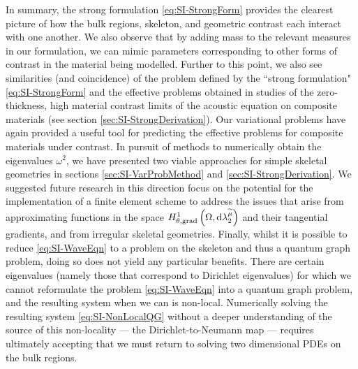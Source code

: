 In summary, the strong formulation \eqref{eq:SI-StrongForm} provides the clearest picture of how the bulk regions, skeleton, and geometric contrast each interact with one another.
We also observe that by adding mass to the relevant measures in our formulation, we can mimic parameters corresponding to other forms of contrast in the material being modelled.
Further to this point, we also see similarities (and coincidence) of the problem defined by the ``strong formulation" \eqref{eq:SI-StrongForm} and the effective problems obtained in studies of the zero-thickness, high material contrast limits of the acoustic equation on composite materials (see section \ref{sec:SI-StrongDerivation}).
Our variational problems have again provided a useful tool for predicting the effective problems for composite materials under contrast.
In pursuit of methods to numerically obtain the eigenvalues $\omega^2$, we have presented two viable approaches for simple skeletal geometries in sections \ref{sec:SI-VarProbMethod} and \ref{sec:SI-StrongDerivation}.
We suggested future research in this direction focus on the potential for the implementation of a finite element scheme to address the issues that arise from approximating functions in the space $H^1_{\theta, \mathrm{grad}}\left( \Omega, \mathrm{d}\lambda_2^{\widetilde{\mu}} \right)$ and their tangential gradients, and from irregular skeletal geometries.
Finally, whilst it is possible to reduce \eqref{eq:SI-WaveEqn} to a problem on the skeleton and thus a quantum graph problem, doing so does not yield any particular benefits.
There are certain eigenvalues (namely those that correspond to Dirichlet eigenvalues) for which we cannot reformulate the problem \eqref{eq:SI-WaveEqn} into a quantum graph problem, and the resulting system when we can is non-local.
Numerically solving the resulting system \eqref{eq:SI-NonLocalQG} without a deeper understanding of the source of this non-locality --- the Dirichlet-to-Neumann map --- requires ultimately accepting that we must return to solving two dimensional PDEs on the bulk regions.

